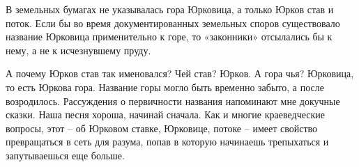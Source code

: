 
В земельных бумагах не указывалась гора Юрковица, а только Юрков став и поток. Если бы во  время документированных земельных споров существовало название Юрковица применительно к горе, то «законники» отсылались бы к нему, а не к исчезнувшему пруду.

А почему Юрков став так именовался? Чей став? Юрков. А гора чья? Юрковица, то есть Юркова гора. Название горы могло быть временно забыто, а после возродилось. Рассуждения о первичности названия напоминают мне докучные сказки. Наша песня хороша, начинай сначала. Как и многие краеведческие вопросы, этот – об Юрковом ставке, Юрковице, потоке – имеет свойство превращаться в сеть для разума, попав в которую начинаешь трепыхаться и запутываешься еще больше.
